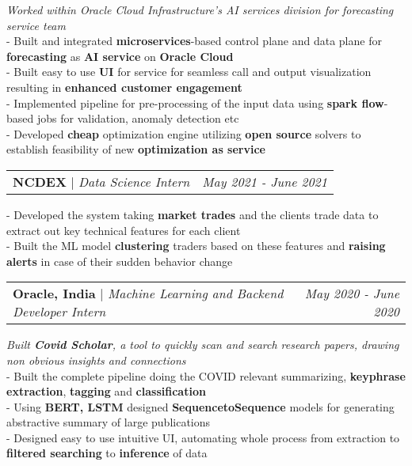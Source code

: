 \documentclass{article}
\makeatletter
\newcommand{\resumeProjectHeading}[2]{
    \item
    \begin{tabular*}{0.97\textwidth}{l@{\extracolsep{\fill}}r}
      \small#1 & #2 \\
    \end{tabular*}\vspace{-7pt}
}
\makeatother
\begin{document}
        \vspace{7pt}
        {\textit{\small Worked within Oracle Cloud Infrastructure's AI services division for forecasting service team}} \\
         
        {\small - Built and integrated \textbf{microservices}-based control plane and data plane for \textbf{forecasting} as \textbf{AI service} on \textbf{Oracle Cloud}} \\
        {\small - Built easy to use \textbf{UI} for service for seamless call and output visualization resulting in \textbf{enhanced customer engagement}} \\
        {\small - Implemented pipeline for pre-processing of the input data using \textbf{spark flow}-based jobs for validation, anomaly detection etc}\\
        {\small - Developed \textbf{cheap} optimization engine utilizing \textbf{open source} solvers to establish feasibility of new \textbf{optimization as service}} \\

        \resumeProjectHeading
          {\textbf{NCDEX} $|$ \textit{\small Data Science Intern}}{\textit{May 2021 - June 2021}} 
          
           \vspace{3pt} 
           {\small - Developed the system taking \textbf{market trades} and the clients trade data to extract out key technical features for each client} \\
          {\small - Built the ML model \textbf{clustering} traders based on these features and \textbf{raising alerts} in case of their sudden behavior change}

    \resumeProjectHeading
          {\textbf{Oracle, India} $|$ \textit{\small Machine Learning and Backend Developer Intern}}{\textit{May 2020 - June 2020}}
          
              \vspace{3pt}
              \textit{\small Built \textbf{Covid Scholar}, a tool to quickly scan and search research papers, drawing non obvious insights and connections } \\
              
              {\small - Built the complete pipeline doing the COVID relevant summarizing, \textbf{keyphrase extraction}, \textbf{tagging} and \textbf{classification}}\\
              {\small - Using \textbf{BERT, LSTM} designed \textbf{SequencetoSequence} models for generating abstractive summary of large publications} \\
              {\small - Designed easy to use intuitive UI, automating whole process from extraction to \textbf{filtered searching} to \textbf{inference} of data}
\end{document}

